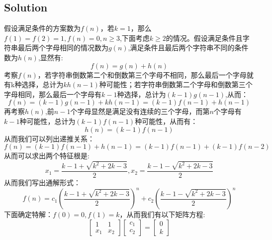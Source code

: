 \documentclass[a4paper]{ctexart}
\begin{document}
\subsection{Solution}
假设满足条件的方案数为$f(n)$，若$k=1$，那么$f(1)=f(2)=1,f(n)=0,n\geq 3$,下面考虑$k\geq 2$的情况。假设满足条件且字符串最后两个字母相同的情况数为$g(n)$,满足条件且最后两个字符串不同的条件数为$h(n)$,显然有:
\begin{equation}
    f(n)=g(n)+h(n)
\end{equation}
考察$f(n)$，若字符串倒数第二个和倒数第三个字母不相同，那么最后一个字母就有k种选择，总计为$kh(n-1)$种可能性；若字符串倒数第二个字母和倒数第三个字母相同，那么最后一个字母有$k-1$种选择，总计为$(k-1)g(n-1)$,从而：
\begin{equation}
    f(n) = (k-1)g(n-1)+kh(n-1)=(k-1)f(n-1)+h(n-1)
\end{equation}
再考察$h(n)$,前$n-1$个字母显然是满足没有连续的三个字母，而第$n$个字母有$k-1$种可能性，总计为$(k-1)f(n-1)$种可能性，从而有：
\begin{equation}
    h(n)=(k-1)f(n-1)
\end{equation}
从而我们可以列出递推关系：
\begin{equation}
    f(n)=(k-1)f(n-1)+h(n-1)=(k-1)f(n-1)+(k-1)f(n-2)
\end{equation}
从而可以求出两个特征根是:
\begin{equation}
    x_1=\frac{k-1+\sqrt{k^2+2k-3}}{2}, x_2=\frac{k-1-\sqrt{k^2+2k-3}}{2}
\end{equation}
从而我们写出通解形式：
\begin{equation}
    f(n)=c_1(\frac{k-1+\sqrt{k^2+2k-3}}{2})^n+c_2(\frac{k-1-\sqrt{k^2+2k-3}}{2})^n
\end{equation}
下面确定特解：$f(0)=0, f(1)=k$，从而我们有以下矩阵方程:
\begin{equation}
    \left[
        \begin{array}{cc}
            1   & 1   \\
            x_1 & x_2
        \end{array}
        \right]
    \left[
        \begin{array}{c}
            c_{1} \\
            c_{2}
        \end{array}
        \right]
    =
    \left[
        \begin{array}{c}
            0 \\
            k
        \end{array}
        \right]
\end{equation}
\end{document}
